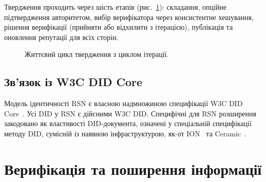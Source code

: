 \documentclass[11pt,a4paper,twocolumn]{article}
\begin{document}
Твердження проходить через шість етапів (рис.~\ref{fig:lifecycle}): складання, опційне підтвердження авторитетом, вибір верифікатора через консистентне хешування, рішення верифікації (прийняти або відхилити з ітерацією), публікація та оновлення репутації для всіх сторін.

\begin{figure}[ht]
\centering
{}
\caption{Життєвий цикл твердження з циклом ітерації.}
\label{fig:lifecycle}
\end{figure}

\subsection{Зв'язок із W3C DID Core}

Модель ідентичності RSN є власною надмножиною специфікації W3C DID Core~\cite{did2022}. Усі DID у RSN є дійсними W3C DID. Специфічні для RSN розширення закодовано як властивості DID-документа, означені у спеціальній специфікації методу DID, сумісній із наявною інфраструктурою, як-от ION~\cite{buchner2021} та Ceramic~\cite{ceramic2023}.

\section{Верифікація та поширення інформації}
\end{document}
